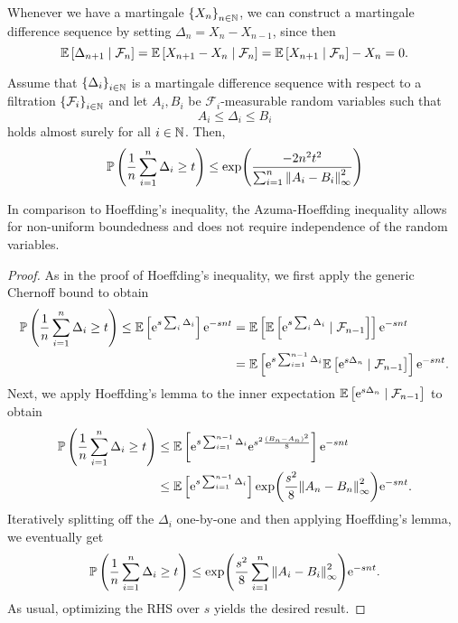Whenever we have a martingale $\left\{X_n\right\}_{n\in\mathbb{N}}$, we can construct a martingale difference sequence by setting $\Delta_n = X_n - X_{n-1}$, since then
\[
    \mathbb{E}\left[\Delta_{n+1} \mathrel{|} \mathcal{F}_n\right] = \mathbb{E}\left[X_{n+1} - X_n \mathrel{|} \mathcal{F}_n\right] = \mathbb{E}\left[X_{n+1} \mathrel{|} \mathcal{F}_n\right] - X_n = 0.
\]

\begin{theorem}
\label{thm: azuma-hoeffding}
Assume that $\left\{\Delta_i\right\}_{i\in\mathbb{N}}$ is a martingale difference sequence with respect to a filtration $\left\{\mathcal{F}_i\right\}_{i\in\mathbb{N}}$ and let $A_i, B_i$ be $\mathcal{F}_i$-measurable random variables such that
\[
    A_i \leq \Delta_i \leq B_i
\]
holds almost surely for all $i \in \mathbb{N}$. Then,
\[
    \mathbb{P}\left(\frac{1}{n}\sum_{i=1}^n \Delta_i \geq t\right) \leq \exp(\frac{-2n^2t^2}{\sum_{i=1}^n \norm{A_i - B_i}_\infty^2})
\]
\end{theorem}

In comparison to Hoeffding’s inequality, the Azuma-Hoeffding inequality allows for non-uniform boundedness and does not require independence of the random variables.

\begin{proof}
As in the proof of Hoeffding's inequality, we first apply the generic Chernoff bound to obtain
\begin{align*}
    \mathbb{P}\left(\frac{1}{n}\sum_{i=1}^n \Delta_i \geq t\right) \leq \mathbb{E}\left[\mathrm{e}^{s\sum_i \Delta_i}\right] \mathrm{e}^{-snt} &= \mathbb{E}\left[\mathbb{E}\left[\mathrm{e}^{s\sum_i \Delta_i} \mathrel{|} \mathcal{F}_{n-1}\right]\right] \mathrm{e}^{-snt} \\
        &= \mathbb{E}\left[\mathrm{e}^{s\sum_{i=1}^{n-1} \Delta_i} \mathbb{E}\left[\mathrm{e}^{s\Delta_n} \mathrel{|} \mathcal{F}_{n-1}\right]\right] \mathrm{e}^{-snt}.
\end{align*}
Next, we apply Hoeffding's lemma to the inner expectation $\mathbb{E}\left[\mathrm{e}^{s\Delta_n} \mathrel{|} \mathcal{F}_{n-1}\right]$ to obtain
\begin{align*}
    \mathbb{P}\left(\frac{1}{n}\sum_{i=1}^n \Delta_i \geq t\right) &\leq \mathbb{E}\left[\mathrm{e}^{s\sum_{i=1}^{n-1} \Delta_i} \mathrm{e}^{s^2\frac{(B_n - A_n)^2}{8}}\right] \mathrm{e}^{-snt} \\
        &\leq \mathbb{E}\left[\mathrm{e}^{s\sum_{i=1}^{n-1} \Delta_i}\right] \exp(\frac{s^2}{8}\norm{A_n - B_n}^2_\infty) \mathrm{e}^{-snt}.
\end{align*}
Iteratively splitting off the $\Delta_i$ one-by-one and then applying Hoeffding's lemma, we eventually get
\[
    \mathbb{P}\left(\frac{1}{n}\sum_{i=1}^n \Delta_i \geq t\right) \leq \exp(\frac{s^2}{8}\sum_{i=1}^n \norm{A_i - B_i}_\infty^2) \mathrm{e}^{-snt}.
\]
As usual, optimizing the RHS over $s$ yields the desired result.
\end{proof}
